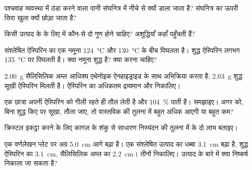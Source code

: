 \begin{exercise}[$\star$]\label{exo:g10:synthesis-yield:3}
पश्चवाह व्यवस्था में ठंडा करने वाला पानी संघनित्र में नीचे से क्यों डाला जाता है?
संघनित्र का ऊपरी सिरा खुला क्यों छोड़ा जाता है?
\end{exercise}

\begin{exercise}[$\star$]\label{exo:g10:synthesis-yield:4}
किसी उत्पाद के  के लिए  में कौन-से दो गुण होने चाहिए?
अशुद्धियाँ कहाँ पहुँचती हैं?
\end{exercise}

\begin{exercise}[$\star$]\label{exo:g10:synthesis-yield:5}
संश्लेषित ऐस्पिरिन का एक नमूना \qty{124}{\celsius} और
\qty{130}{\celsius} के बीच पिघलता है। शुद्ध ऐस्पिरिन लगभग \qty{135}{\celsius} पर
पिघलती है। क्या नमूना शुद्ध है? क्या करना चाहिए?
\end{exercise}

\begin{exercise}[$\star\star$]\label{exo:g10:synthesis-yield:6}
\qty{2.00}{g} सैलिसिलिक अम्ल आधिक्य एथेनोइक ऐनहाइड्राइड के साथ अभिक्रिया करता है;
\qty{2.03}{g} शुद्ध सूखी ऐस्पिरिन मिलती है। ऐस्पिरिन का अधिकतम द्रव्यमान
और  निकालिए।
\end{exercise}

\begin{exercise}[$\star\star$]\label{exo:g10:synthesis-yield:7}
एक छात्रा अपनी ऐस्पिरिन को गीली रहते ही तौल लेती है और
\qty{104}{\percent}  पाती है। समझाइए। अगर  को, बिना शुद्ध
किए पर सूखा, तौला जाए, तो  वास्तविक  की तुलना में बहुत अधिक आएगी या
बहुत कम?
\end{exercise}

\begin{exercise}[$\star\star$]\label{exo:g10:synthesis-yield:8}
क्रिस्टल इकट्ठा करने के लिए कागज़ के शंकु से साधारण निस्यंदन की तुलना में  के दो लाभ बताइए।
\end{exercise}

\begin{exercise}[$\star\star$]\label{exo:g10:synthesis-yield:9}
एक वर्णलेखन प्लेट पर  अग्र \qty{5.0}{cm} आगे बढ़ा है। एक
संश्लेषित उत्पाद का धब्बा \qty{3.1}{cm} बढ़ा है, शुद्ध
ऐस्पिरिन का \qty{3.1}{cm}, सैलिसिलिक अम्ल का \qty{2.2}{cm}। तीनों
 निकालिए। उत्पाद के बारे में क्या निष्कर्ष निकाला जा सकता है?
\end{exercise}

